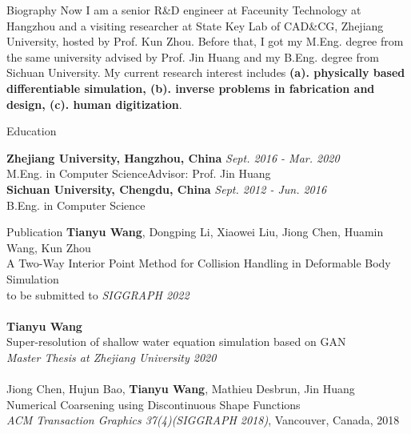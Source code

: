 \documentclass{resume} %
\begin{document}
\begin{rSection}{Biography}
  Now I am a senior R\&D engineer at Faceunity Technology at Hangzhou and a visiting researcher at State Key Lab of CAD\&CG, Zhejiang University, hosted by Prof. Kun Zhou. Before that, I got my M.Eng. degree from the same university advised by Prof. Jin Huang and my B.Eng. degree from Sichuan University. My current research interest includes \textbf{(a). physically based differentiable simulation, (b). inverse problems in fabrication and design, (c). human digitization}.
\end{rSection}

\begin{rSection}{Education}

{\bf Zhejiang University, Hangzhou, China} \hfill {\em Sept. 2016 - Mar. 2020} 
\\ M.Eng. in Computer Science\hfill {Advisor: Prof. Jin Huang} 
\\{\bf Sichuan University, Chengdu, China} \hfill {\em Sept. 2012 - Jun. 2016} 
\\ B.Eng. in Computer Science\hfill {}

\end{rSection}

\begin{rSection}{Publication}
  {\textbf{Tianyu Wang}, Dongping Li, Xiaowei Liu, Jiong Chen, Huamin Wang, Kun Zhou\\ A Two-Way Interior Point Method for Collision Handling in Deformable Body Simulation\\ to be submitted to \emph{SIGGRAPH 2022}}
  \\ \\{\textbf{Tianyu Wang}\\Super-resolution of shallow water equation simulation based on GAN\\\emph{Master Thesis at Zhejiang University 2020}}
  \\ \\{Jiong Chen, Hujun Bao, \textbf{Tianyu Wang}, Mathieu Desbrun, Jin Huang\\Numerical Coarsening using Discontinuous Shape Functions\\\emph{ACM Transaction Graphics 37(4)(SIGGRAPH 2018)}, Vancouver, Canada, 2018}
\end{rSection}
\end{document}
